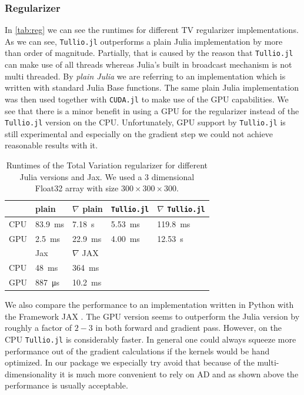 \documentclass{juliacon}
\begin{document}
        \subsubsection{Regularizer}
            In \autoref{tab:reg} we can see the runtimes for different TV regularizer implementations. As we can see, \verb|Tullio.jl| outperforms a plain 
            Julia implementation by more than order of magnitude. Partially, that is caused by the reason that \verb|Tullio.jl| can make 
            use of all threads whereas Julia's built in broadcast mechanism is not multi threaded.
            By \textit{plain Julia} we are referring to an implementation which is written with standard Julia Base functions.
            The same plain Julia implementation was then used together with \verb|CUDA.jl|
            to make use of the GPU capabilities. We see that there is a minor benefit in using a GPU for the regularizer instead of 
            the \verb|Tullio.jl| version on the CPU. Unfortunately, GPU support by \verb|Tullio.jl| is still experimental and especially on the gradient step 
            we could not achieve reasonable results with it.
            \begin{table}[h]
                \begin{tabular}{l l l l l}
                    & plain & $\nabla$ plain & \verb|Tullio.jl| & $\nabla$ \verb|Tullio.jl| \\
                \hline
                CPU & \SI{83.9}{\milli\second} & \SI{7.18}{\second} & \SI{5.53}{\milli\second}  & \SI{119.8}{\milli\second}   \\ 
                GPU & \SI{2.5}{\milli\second}  & \SI{22.9}{\milli\second}& \SI{4.00}{\milli\second}  & \SI{12.53}{\second} \\
                \hline
                \hline
                    & Jax & $\nabla$ JAX && \\
                \hline
                CPU & \SI{48}{\milli\second}   & \SI{364}{\milli\second}&   & \\
                GPU & \SI{887}{\micro\second}   & \SI{10.2}{\milli\second}&   &
                \end{tabular}
                \caption{Runtimes of the Total Variation regularizer for different Julia versions and Jax. 
                    We used a 3 dimensional Float32 array with size $300 \times 300 \times 300$.  }
                \label{tab:reg}
            \end{table}
            We also compare the performance to an implementation written in Python with the Framework JAX \cite{jax2018github}. 
            The GPU version seems to outperform the Julia version by roughly a factor of $2 - 3$ in both forward and gradient pass.
            However, on the CPU \verb|Tullio.jl| is considerably faster. 
            In general one could always squeeze more performance out of the gradient calculations if the kernels would be hand optimized.
            In our package we especially try avoid that because of the multi-dimensionality it is much more convenient
            to rely on AD and as shown above the performance is usually acceptable.
\end{document}
